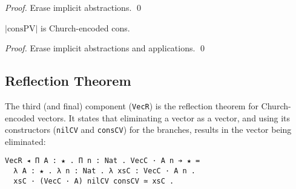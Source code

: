 \documentclass[a4paper,envcountsame,envcountsect]{llncs}
\newcommand{\labsec}[1]{\label{sec:#1}}
\newcommand{\lablem}[1]{\label{lem:#1}}
\newcommand{\nega}[0]{\ensuremath{{\text -}}}
\newcommand{\earg}[1]{\,\,#1}
\newcommand{\iarg}[1]{\ensuremath{\,\nega #1}}
\newcommand{\targ}[1]{\ensuremath{\cdot #1}}
\newcommand{\erase}[1]{\ensuremath{\lvert #1 \rvert}}
\newcommand{\fun}[1]{\lambda #1 .~}
\newcommand{\all}[1]{\Lambda #1 .~}
\newcommand{\by}[1]{\text{#1}}
\newcommand{\name}[1]{\textrm{#1}}
\begin{document}
\begin{proof}
{\small Erase implicit abstractions. \qed}
\end{proof}

\begin{lemma}
\erase{\name{consPV}} is Church-encoded cons.
\lablem{conspv}
\end{lemma}

\begin{proof}
{\small Erase implicit abstractions and applications. \qed}
\end{proof}

\subsection{Reflection Theorem}
\labsec{ind:reflect}

The third (and final) component (\texttt{VecR}) is the reflection
theorem for Church-encoded vectors. It states that eliminating a
vector as a vector, and using its constructors
(\texttt{nilCV} and \texttt{consCV}) for the branches, results in the
vector being eliminated:

\begin{verbatim}
VecR ◂ Π A : ★ . Π n : Nat . VecC · A n ➔ ★ =
  λ A : ★ . λ n : Nat . λ xsC : VecC · A n .
  xsC · (VecC · A) nilCV consCV ≃ xsC .
\end{verbatim}
\end{document}

